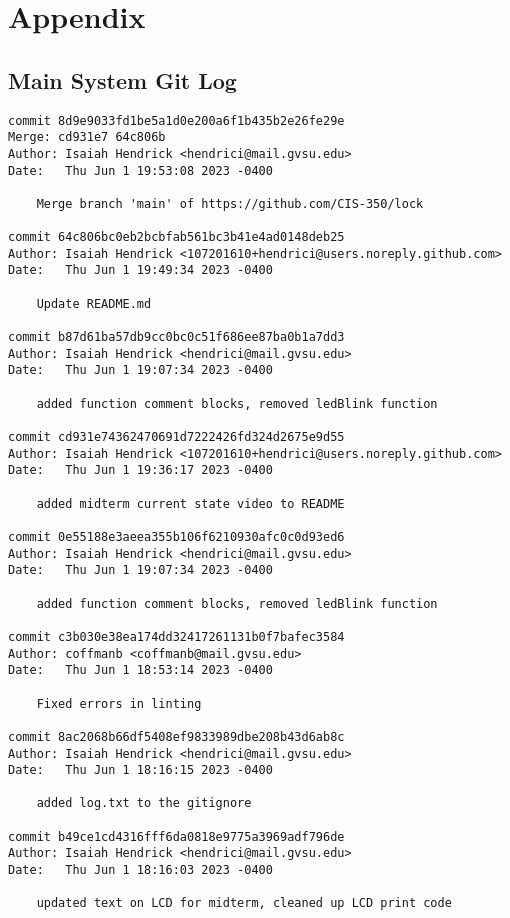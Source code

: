 \chapter{Appendix}
\section{Main System Git Log}
\hypertarget{mainlog}{}
\begin{verbatim}
commit 8d9e9033fd1be5a1d0e200a6f1b435b2e26fe29e
Merge: cd931e7 64c806b
Author: Isaiah Hendrick <hendrici@mail.gvsu.edu>
Date:   Thu Jun 1 19:53:08 2023 -0400

    Merge branch 'main' of https://github.com/CIS-350/lock

commit 64c806bc0eb2bcbfab561bc3b41e4ad0148deb25
Author: Isaiah Hendrick <107201610+hendrici@users.noreply.github.com>
Date:   Thu Jun 1 19:49:34 2023 -0400

    Update README.md

commit b87d61ba57db9cc0bc0c51f686ee87ba0b1a7dd3
Author: Isaiah Hendrick <hendrici@mail.gvsu.edu>
Date:   Thu Jun 1 19:07:34 2023 -0400

    added function comment blocks, removed ledBlink function

commit cd931e74362470691d7222426fd324d2675e9d55
Author: Isaiah Hendrick <107201610+hendrici@users.noreply.github.com>
Date:   Thu Jun 1 19:36:17 2023 -0400

    added midterm current state video to README

commit 0e55188e3aeea355b106f6210930afc0c0d93ed6
Author: Isaiah Hendrick <hendrici@mail.gvsu.edu>
Date:   Thu Jun 1 19:07:34 2023 -0400

    added function comment blocks, removed ledBlink function

commit c3b030e38ea174dd32417261131b0f7bafec3584
Author: coffmanb <coffmanb@mail.gvsu.edu>
Date:   Thu Jun 1 18:53:14 2023 -0400

    Fixed errors in linting

commit 8ac2068b66df5408ef9833989dbe208b43d6ab8c
Author: Isaiah Hendrick <hendrici@mail.gvsu.edu>
Date:   Thu Jun 1 18:16:15 2023 -0400

    added log.txt to the gitignore

commit b49ce1cd4316fff6da0818e9775a3969adf796de
Author: Isaiah Hendrick <hendrici@mail.gvsu.edu>
Date:   Thu Jun 1 18:16:03 2023 -0400

    updated text on LCD for midterm, cleaned up LCD print code


\end{verbatim}
